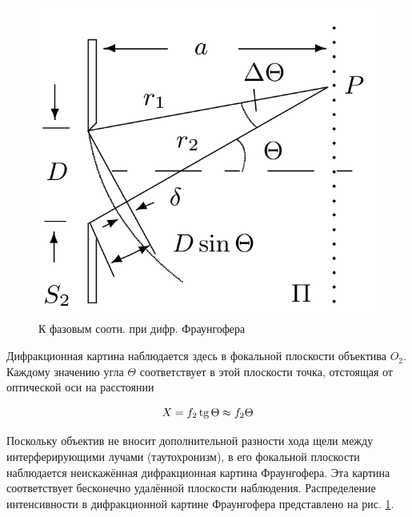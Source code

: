 \documentclass[a5paper,10pt, twoside]{article} %
\begin{document}
	\begin{figure} %
		\includegraphics[width=\linewidth]{phase.png}
		\caption{К фазовым соотн. при дифр. Фраунгофера}
		\label{img:phase}
	\end{figure}

	Дифракционная картина наблюдается здесь в фокальной плоскости объектива $O_2$. Каждому значению
	угла $\Theta$ соответствует в этой плоскости точка, отстоящая от оптической оси на расстоянии

	\begin{equation}
		X = f_2 \mathop{\mathrm{tg}}\nolimits \Theta \approx f_2 \Theta
	\end{equation}\label{eq:dist}

	Поскольку объектив не вносит дополнительной разности хода щели между интерферирующими лучами
	(таутохронизм), в его фокальной плоскости наблюдается неискажённая дифракционная картина 
	Фраунгофера. Эта картина соответствует бесконечно удалённой плоскости наблюдения. Распределение
	интенсивности в дифракционной картине Фраунгофера представлено на рис. \ref{img:phase}.
\end{document}
